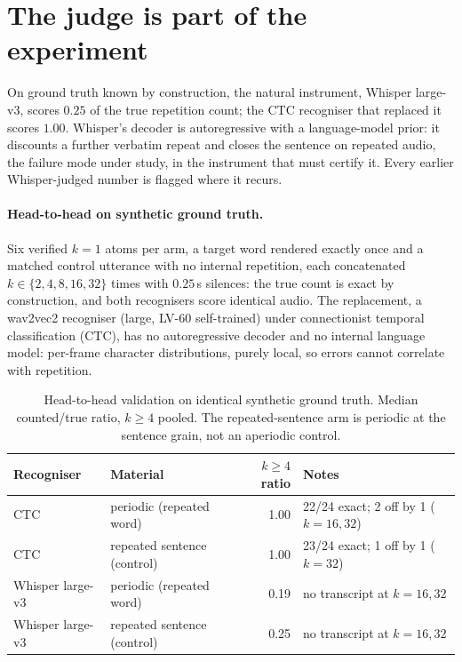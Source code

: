 \section{The judge is part of the experiment}\label{sec:judge}
On ground truth known by construction, the natural instrument, Whisper large-v3, scores $0.25$ of the true
repetition count; the CTC recogniser that replaced it scores $1.00$. Whisper's decoder is autoregressive with a
language-model prior: it discounts a further verbatim repeat and closes the sentence on repeated audio, the failure
mode under study, in the instrument that must certify it. Every earlier Whisper-judged number is flagged where it
recurs.

\paragraph{Head-to-head on synthetic ground truth.}
Six verified $k{=}1$ atoms per arm, a target word rendered exactly once and a matched control utterance with no
internal repetition, each concatenated $k\in\{2,4,8,16,32\}$ times with $0.25\,$s silences: the true count is exact
by construction, and both recognisers score identical audio. The replacement, a wav2vec2 recogniser (large, LV-60
self-trained) under connectionist temporal classification (CTC), has no autoregressive decoder and no internal
language model: per-frame character distributions, purely local, so errors cannot correlate with repetition.
\begin{table}[tp]
\centering
\caption{Head-to-head validation on identical synthetic ground truth. Median counted/true ratio, $k\ge4$
pooled. The repeated-sentence arm is periodic at the sentence grain, not an aperiodic control.}
\label{tab:ctcval}
\small
\begin{tabular}{@{}llrl@{}}
\toprule
Recogniser & Material & $k\ge4$ ratio & Notes \\
\midrule
CTC & periodic (repeated word) & 1.00 & 22/24 exact; 2 off by 1 ($k{=}16,32$) \\
CTC & repeated sentence (control) & 1.00 & 23/24 exact; 1 off by 1 ($k{=}32$) \\
Whisper large-v3 & periodic (repeated word) & 0.19 & no transcript at $k{=}16,32$ \\
Whisper large-v3 & repeated sentence (control) & 0.25 & no transcript at $k{=}16,32$ \\
\bottomrule
\end{tabular}
\end{table}

